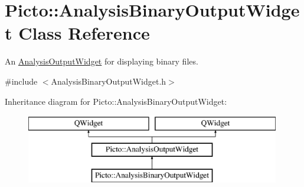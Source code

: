 \hypertarget{class_picto_1_1_analysis_binary_output_widget}{\section{Picto\-:\-:Analysis\-Binary\-Output\-Widget Class Reference}
\label{class_picto_1_1_analysis_binary_output_widget}
}


An \hyperlink{class_picto_1_1_analysis_output_widget}{Analysis\-Output\-Widget} for displaying binary files.  




{\ttfamily \#include $<$Analysis\-Binary\-Output\-Widget.\-h$>$}

Inheritance diagram for Picto\-:\-:Analysis\-Binary\-Output\-Widget\-:\begin{figure}[H]
\begin{center}
\leavevmode
\includegraphics[height=3.000000cm]{class_picto_1_1_analysis_binary_output_widget}
\end{center}
\end{figure}
